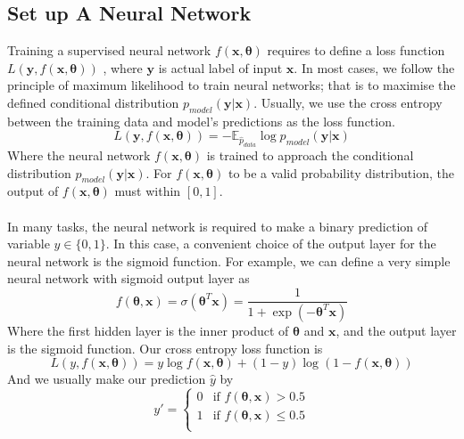 \subsection{Set up A Neural Network}
Training a supervised neural network $f(\mathbf{x},\mathbf{\theta})$ requires to define a loss function $L(\mathbf{y},f(\mathbf{x},\mathbf{\theta}))$ , where $\mathbf{y}$ is actual label of input $\mathbf{x}$.
In most cases, we follow the principle of maximum likelihood to train neural networks; that is to maximise the defined conditional distribution $p_{model}(\mathbf{y}|\mathbf{x})$. Usually, we use the cross entropy between the training data and model's predictions as the loss function\cite{Goodfellow2016Book}.
\begin{equation}
L(\mathbf{y},f(\mathbf{x},\mathbf{\theta})) = -\mathbb{E}_{\hat{p}_{data}} \log p_{model}(\mathbf{y}|\mathbf{x})
\end{equation}
Where the neural network $f(\mathbf{x},\mathbf{\theta})$ is trained to approach the conditional distribution $p_{model}(\mathbf{y}|\mathbf{x})$. 
For $f(\mathbf{x},\mathbf{\theta})$ to be a valid probability distribution, the output of  $f(\mathbf{x},\mathbf{\theta})$ must within $[0,1]$. \\\\
In many tasks, the neural network is required to make a binary prediction of variable $y \in \{0,1\} $. In this case, a convenient choice of the output layer for the neural network is the sigmoid function. For example, we can define a very simple neural network with sigmoid output layer as
\begin{equation}
f(\mathbf{\theta},\mathbf{x}) = \sigma(\mathbf{\theta}^{T}\mathbf{x}) = \frac{1}{1+\exp({-\mathbf{\theta}^{T}\mathbf{x}})}
\label{sigmoid}
\end{equation}
Where the first hidden layer is the inner product of $\mathbf{\theta}$ and $\mathbf{x}$, and the output layer is the sigmoid function. 
Our cross entropy loss function is 
\begin{equation}
L(y,f(\mathbf{x},\mathbf{\theta})) = y\log f(\mathbf{x},\mathbf{\theta}) + (1-y)\log(1-f(\mathbf{x},\mathbf{\theta}))
\end{equation}
And we usually make our prediction $\hat{y}$ by
\begin{equation}
y' = \begin{cases}
0 & \text{if } f(\mathbf{\theta},\mathbf{x}) > 0.5\\
1 & \text {if } f(\mathbf{\theta},\mathbf{x}) \leq 0.5 \\
\end{cases}
\end{equation}\\\\
